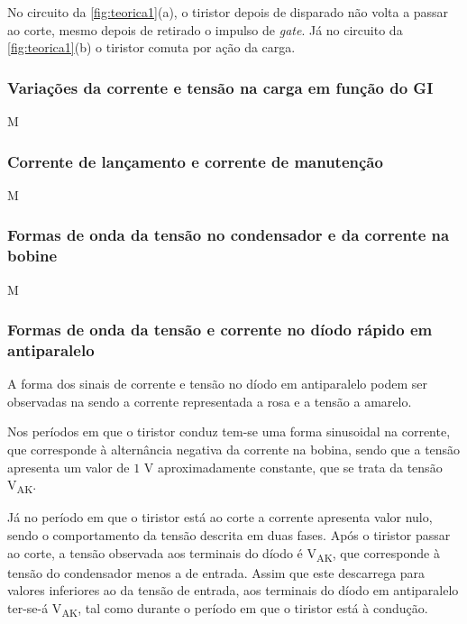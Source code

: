 \documentclass[a4paper,11pt]{article}
\numberwithin{equation}{section}
\begin{document}
No circuito da \autoref{fig:teorica1}(a), o tiristor depois de disparado não volta a passar ao corte, mesmo depois de retirado o impulso de \textit{gate}. Já no circuito da \autoref{fig:teorica1}(b) o tiristor comuta por ação da carga.


\subsubsection{Variações da corrente e tensão na carga em função do GI}

M


\subsubsection{Corrente de lançamento e corrente de manutenção}

M

\subsubsection{Formas de onda da tensão no condensador e da corrente na bobine}

M

\subsubsection{Formas de onda da tensão e corrente no díodo rápido em antiparalelo}

A forma dos sinais de corrente e tensão no díodo em antiparalelo podem ser observadas na  sendo a corrente representada a rosa e a tensão a amarelo.

Nos períodos em que o tiristor conduz tem-se uma forma sinusoidal na corrente, que corresponde à alternância negativa da corrente na bobina, sendo que a tensão apresenta um valor de $1$ V aproximadamente constante, que se trata da tensão V\textsubscript{AK}. 

Já no período em que o tiristor está ao corte a corrente apresenta valor nulo, sendo o comportamento da tensão descrita em duas fases. Após o tiristor passar ao corte, a tensão observada aos terminais do díodo é V\textsubscript{AK}, que corresponde à tensão do condensador menos a de entrada. Assim que este descarrega para valores inferiores ao da tensão de entrada, aos terminais do díodo em antiparalelo ter-se-á V\textsubscript{AK}, tal como durante o período em que o tiristor está à condução.
\end{document}
